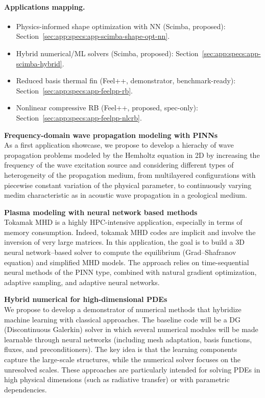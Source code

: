 \paragraph{Applications mapping.}
\begin{itemize}
  \item Physics-informed shape optimization with NN (Scimba, proposed): Section~\ref{sec:app:specs:app-scimba-shape-opt-nn}.
  \item Hybrid numerical/ML solvers (Scimba, proposed): Section~\ref{sec:app:specs:app-scimba-hybrid}.
  \item Reduced basis thermal fin (Feel++, demonstrator, benchmark-ready): Section~\ref{sec:app:specs:app-feelpp-rb}.
  \item Nonlinear compressive RB (Feel++, proposed, spec-only): Section~\ref{sec:app:specs:app-feelpp-nlcrb}.
\end{itemize}

\textbf{Frequency-domain wave propagation modeling with PINNs} \\

As a first  application showcase, we propose to develop  a hierachy of
wave propagation  problems modeled by  the Hemholtz equation in  2D by
increasing   the  frequency   of  the   wave  excitation   source  and
considering  different  types  of heterogeneity  of  the  propagation
medium,  from  multilayered  configurations  with  piecewise  constant
variation  of the  physical parameter,  to continuously  varying medim
characteristic  as  in  acoustic  wave propagation  in  a  geological
medium.

\textbf{Plasma modeling with neural network based methods }\\

Tokamak MHD is a highly HPC-intensive application, especially in terms
of  memory consumption.  Indeed, tokamak  MHD codes  are implicit  and
involve the inversion of very large matrices. In this application, the
goal  is to  build a  3D neural  network–based solver  to compute  the
equilibrium (Grad–Shafranov  equation) and simplified MHD  models. The
approach relies  on time-sequential neural  methods of the  PINN type,
combined with  natural gradient  optimization, adaptive  sampling, and
adaptive neural networks.

\textbf{Hybrid numerical for high-dimensional PDEs}\\

We  propose  to  develop  a demonstrator  of  numerical  methods  that
hybridize  machine learning  with classical  approaches. The  baseline
code will  be a  DG (Discontinuous Galerkin)  solver in  which several
numerical  modules  will be  made  learnable  through neural  networks
(including   mesh    adaptation,   basis   functions,    fluxes,   and
preconditioners). The key idea is that the learning components capture
the large-scale structures, while the  numerical solver focuses on the
unresolved  scales. These  approaches  are  particularly intended  for
solving PDEs in high physical  dimensions (such as radiative transfer)
or with parametric dependencies.

